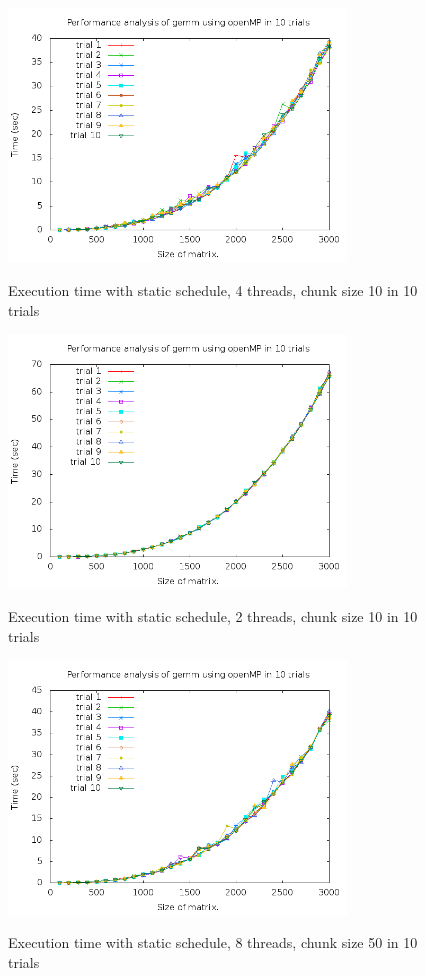 \documentclass{article}
\begin{document}
    \begin{figure}[th!]
        \centering
        \includegraphics[width=0.8\textwidth]{static_ck10_4.png}
        \label{fig:2}
        \caption{Execution time with static schedule, 4 threads, chunk size 10 in 10 trials}
    \end{figure}
    
    \begin{figure}[th!]
        \centering
        \includegraphics[width=0.8\textwidth]{static_ck10_2.png}
        \label{fig:3}
        \caption{Execution time with static schedule, 2 threads, chunk size 10 in 10 trials}
    \end{figure}
    \begin{figure}[th!]
        \centering
        \includegraphics[width=0.8\textwidth]{static_ck50_8.png}
        \label{fig:4}
        \caption{Execution time with static schedule, 8 threads, chunk size 50 in 10 trials}
    \end{figure}
\end{document}
